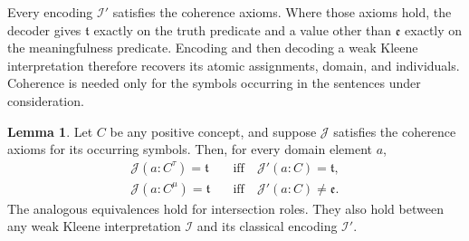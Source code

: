 \documentclass[letterpaper]{article} %
\theoremstyle{definition}
\newtheorem{lemma}{Lemma}
\theoremstyle{definition}
\theoremstyle{definition}
\theoremstyle{definition}
\theoremstyle{definition}
\newcommand{\vt}{\mathfrak{t}}
\newcommand{\vu}{\mathfrak{e}}
\begin{document}
Every encoding $\mathcal{I}'$ satisfies the coherence axioms. Where those axioms hold, the decoder gives $\vt$ exactly on the truth predicate and a value other than $\vu$ exactly on the meaningfulness predicate. Encoding and then decoding a weak Kleene interpretation therefore recovers its atomic assignments, domain, and individuals. Coherence is needed only for the symbols occurring in the sentences under consideration.

\begin{lemma}\label{lem:concept-correspondence}
Let $C$ be any positive concept, and suppose $\mathcal{J}$ satisfies the coherence axioms for its occurring symbols. Then, for every domain element $a$,
\begin{align*}
\mathcal{J}(a:C^{\tau})=\vt
 &\quad\text{iff}\quad\mathcal{J}'(a:C)=\vt,\\
\mathcal{J}(a:C^{\mu})=\vt
 &\quad\text{iff}\quad\mathcal{J}'(a:C)\neq\vu.
\end{align*}
The analogous equivalences hold for intersection roles. They also hold between any weak Kleene interpretation $\mathcal{I}$ and its classical encoding $\mathcal{I}'$.
\end{lemma}
\end{document}
